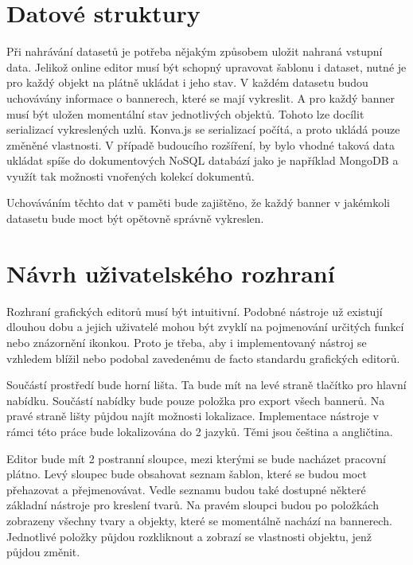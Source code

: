     \section{Datové struktury}
    Při nahrávání datasetů je potřeba nějakým způsobem uložit nahraná vstupní data. Jelikož online editor musí být schopný upravovat šablonu i dataset,
    nutné je pro každý objekt na plátně ukládat i jeho stav. V každém datasetu budou uchovávány informace o bannerech, které se mají vykreslit.
    A pro každý banner musí být uložen momentální stav jednotlivých objektů. Tohoto lze docílit serializací vykreslených uzlů.
    Konva.js se serializací počítá, a proto ukládá pouze změněné vlastnosti. V případě budoucího rozšíření, by bylo vhodné taková data ukládat spíše do
    dokumentových NoSQL databází jako je například MongoDB a využít tak možnosti vnořených kolekcí dokumentů. 

    Uchováváním těchto dat v paměti bude zajištěno, že každý banner v jakémkoli datasetu bude moct být opětovně správně vykreslen.

    \section{Návrh uživatelského rozhraní}
    Rozhraní grafických editorů musí být intuitivní. Podobné nástroje už existují dlouhou dobu a jejich uživatelé mohou být zvyklí na pojmenování určitých funkcí
    nebo znázornění ikonkou. Proto je třeba, aby i implementovaný nástroj se vzhledem blížil nebo podobal zavedenému de facto standardu grafických editorů. 

    Součástí prostředí bude horní lišta. Ta bude mít na levé straně tlačítko pro hlavní nabídku. Součástí nabídky bude pouze položka pro export všech bannerů.
    Na pravé straně lišty půjdou najít možnosti lokalizace. Implementace nástroje v rámci této práce bude lokalizována do 2 jazyků. Těmi jsou čeština a angličtina. 

    Editor bude mít 2 postranní sloupce, mezi kterými se bude nacházet pracovní plátno. Levý sloupec bude obsahovat seznam šablon,
    které se budou moct přehazovat a přejmenovávat. Vedle seznamu budou také dostupné některé základní nástroje pro kreslení tvarů.
    Na pravém sloupci budou po položkách zobrazeny všechny tvary a objekty, které se momentálně nachází na bannerech.
    Jednotlivé položky půjdou rozkliknout a zobrazí se vlastnosti objektu, jenž půjdou změnit.

